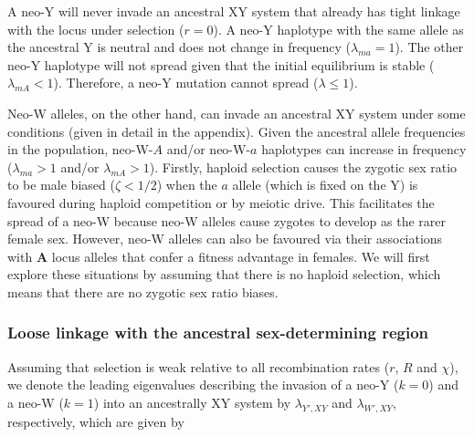\documentclass[12pt]{article}
\begin{document}
A neo-Y will never invade an ancestral XY system that already has tight linkage with the locus under selection ($r=0$). 
A neo-Y haplotype with the same allele as the ancestral Y is neutral and does not change in frequency ($\lambda_{ma}=1$).
The other neo-Y haplotype will not spread given that the initial equilibrium is stable ($\lambda_{mA}<1$). 
Therefore, a neo-Y mutation cannot spread ($\lambda \leq 1$).

Neo-W alleles, on the other hand, can invade an ancestral XY system under some conditions (given in detail in the appendix). 
Given the ancestral allele frequencies in the population, neo-W-$A$ and/or neo-W-$a$ haplotypes can increase in frequency ($\lambda_{ma}>1$ and/or $\lambda_{mA}>1$). 
Firstly, haploid selection causes the zygotic sex ratio to be male biased ($\zeta<1/2$) when the $a$ allele (which is fixed on the Y) is favoured during haploid competition or by meiotic drive. 
This facilitates the spread of a neo-W because neo-W alleles cause zygotes to develop as the rarer female sex. 
However, neo-W alleles can also be favoured via their associations with \textbf{A} locus alleles that confer a fitness advantage in females.
We will first explore these situations by assuming that there is no haploid selection, which means that there are no zygotic sex ratio biases.





\subsubsection*{Loose linkage with the ancestral sex-determining region}

Assuming that selection is weak relative to all recombination rates ($r$, $R$ and $\chi$), we denote the leading eigenvalues describing the invasion of a neo-Y ($k=0$) and a neo-W ($k=1$) into an ancestrally XY system by $\lambda_{Y',XY}$ and $\lambda_{W',XY}$, respectively, which are given by
\end{document}
